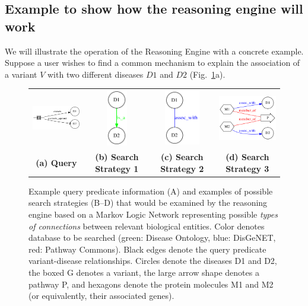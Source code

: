 \documentclass[11pt,notitlepage]{article}
\begin{document}
\subsection{Example to show how the reasoning engine will work}
We will illustrate the operation of the Reasoning Engine with a concrete example. Suppose a user wishes to find a common mechanism to explain the association of a variant $V$ with two different diseases $D1$ and $D2$ (Fig.~\ref{fig:networks}a).
\begin{figure}[h!]
  \begin{tabular}{cccc}
    \includegraphics[width=1.4in]{baseproblem.png} &
    \includegraphics[width=0.35in]{net1.png} &
    \includegraphics[width=0.6in]{net2.png} &
    \includegraphics[width=1.5in]{net3.png}\\
    {\bf (a) Query} & {\bf (b) Search Strategy 1} & {\bf (c) Search Strategy 2} & {\bf (d) Search Strategy 3}
  \end{tabular}
  \caption{Example query predicate information (A) and examples of possible search strategies (B--D) that would be examined by the reasoning engine based on a Markov Logic Network representing possible {\em types of connections\/}  between relevant biological entities. Color denotes database to be searched (green: Disease Ontology, blue: DisGeNET, red: Pathway Commons). Black edges denote the query predicate variant-disease relationships. Circles denote the diseases D1 and D2, the boxed G denotes a variant, the large arrow shape denotes a pathway P, and hexagons denote the protein molecules M1 and M2 (or equivalently, their associated genes).}
  \label{fig:networks}
\end{figure}
\end{document}
